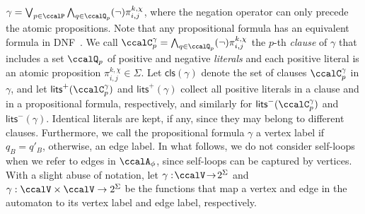 \documentclass[journal]{IEEEtran}
\newcommand{\autop}{\ccalA_{\phi}}
\renewcommand{\ap}[3]{\mathcal{\pi}_{{#1},{#2}}^{#3}}
\begin{document}
{{  $ \gamma = \bigvee_{p\in \ccalP} \bigwedge_{q\in \ccalQ_p} (\neg)\ap{i}{j}{k,\chi}$, where the negation operator can only precede the atomic propositions. Note that any propositional formula has an equivalent formula in DNF~\cite{baier2008principles}. We call  $\ccalC_p^{\gamma}=\bigwedge_{q\in \ccalQ_p}(\neg) \ap{i}{j}{k,\chi}$ the $p$-th {\it clause} of $\gamma$ that includes a set $\ccalQ_p$ of positive and negative {\it literals} and each positive literal is an atomic proposition $\ap{i}{j}{k,\chi}\in \Sigma$. Let $\mathsf{cls}(\gamma)$ denote the set of clauses $\ccalC_p^{\gamma}$ in $\gamma$, and let $\mathsf{lits}^+(\ccalC_p^{\gamma})$ and $\mathsf{lits}^+({\gamma})$ collect all positive literals in a clause and in a propositional formula, respectively, and similarly for $\mathsf{lits}^-(\ccalC_p^{\gamma})$ and $\mathsf{lits}^-({\gamma})$. Identical literals are kept, if any, since they may belong to different clauses. Furthermore, we call the propositional formula $\gamma$ a vertex label if $q_B=q'_B$, otherwise, an edge label. In what follows, we do not consider self-loops when we refer to edges in $\autop$, since self-loops can be captured by vertices.   With a slight abuse of notation, let {$\gamma: \!\ccalV \!\to \! 2^\Sigma $} and {$\gamma: \ccalV \times \ccalV \to 2^\Sigma$} be the functions that map a vertex and edge in the automaton to its vertex label and edge label, respectively.}

}
\end{document}
